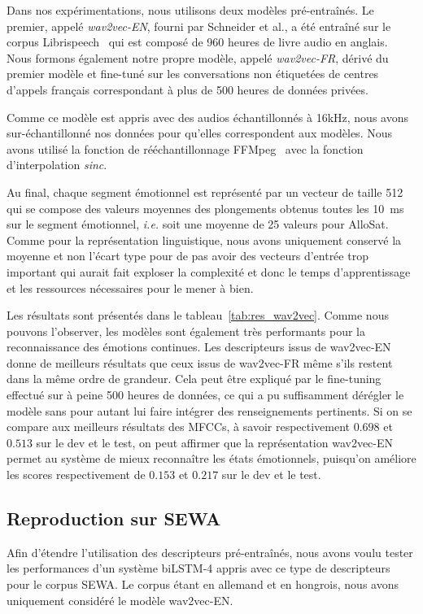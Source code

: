 Dans nos expérimentations, nous utilisons deux modèles pré-entraînés. Le premier, appelé \textit{wav2vec-EN}, fourni par Schneider et al.,  a été entraîné sur le corpus Librispeech~\cite{librispeech} qui est composé de 960 heures de livre audio en anglais.
Nous formons également notre propre modèle, appelé \textit{wav2vec-FR}, dérivé du premier modèle et fine-tuné sur les conversations non étiquetées de centres d'appels français correspondant à plus de 500 heures de données privées.

Comme ce modèle est appris avec des audios échantillonnés à 16kHz, nous avons sur-échantillonné nos données pour qu'elles correspondent aux modèles. Nous avons utilisé la fonction de rééchantillonnage FFMpeg~\cite{Tomar2006} avec la fonction d'interpolation \textit{sinc}.

Au final, chaque segment émotionnel est représenté par un vecteur de taille 512 qui se compose des valeurs moyennes des plongements obtenus toutes les 10~ms sur le segment émotionnel, \textit{i.e.} soit une moyenne de 25 valeurs pour AlloSat. Comme pour la représentation linguistique, nous avons uniquement conservé la moyenne et non l'écart type pour de pas avoir des vecteurs d'entrée trop important qui aurait fait exploser la complexité et donc le temps d'apprentissage et les ressources nécessaires pour le mener à bien.



Les résultats sont présentés dans le tableau~\ref{tab:res_wav2vec}. Comme nous pouvons l'observer, les modèles sont également très performants pour la reconnaissance des émotions continues. Les descripteurs issus de wav2vec-EN donne de meilleurs résultats que ceux issus de wav2vec-FR même s'ils restent dans la même ordre de grandeur. Cela peut être expliqué par le fine-tuning effectué sur à peine 500 heures de données, ce qui a pu suffisamment dérégler le modèle sans pour autant lui faire intégrer des renseignements pertinents. Si on se compare aux meilleurs résultats des MFCCs, à savoir respectivement $0.698$ et $0.513$ sur le dev et le test, on peut affirmer que la représentation wav2vec-EN permet au système de mieux reconnaître les états émotionnels, puisqu'on améliore les scores respectivement de $0.153$ et $0.217$ sur le dev et le test.

\subsection{Reproduction sur SEWA}
Afin d'étendre l'utilisation des descripteurs pré-entraînés, nous avons voulu tester les performances d'un système biLSTM-4 appris avec ce type de descripteurs pour le corpus SEWA. Le corpus étant en allemand et en hongrois, nous avons uniquement considéré le modèle wav2vec-EN.

